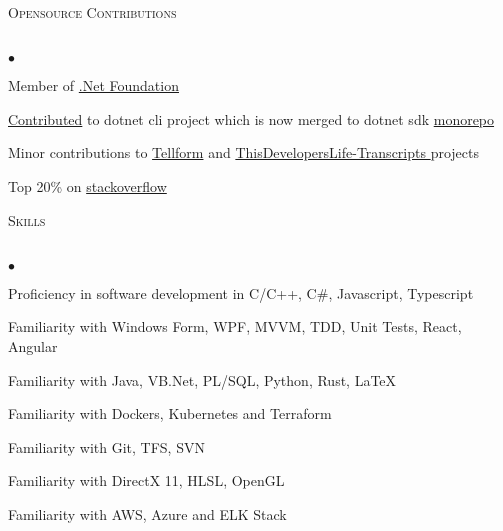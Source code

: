 \documentclass{article}
\newcommand{\lineunder}{\vspace*{-8pt} \\ \hspace*{-18pt} \hrulefill \\}
\newcommand{\header}[1]{{\hspace*{-15pt}\vspace*{6pt} \textsc{#1}} \vspace*{-6pt} \lineunder}
\newenvironment{achievements}{\begin{list}{$\bullet$}{\topsep 0pt \itemsep -2pt}}{\vspace*{4pt}\end{list}}
\begin{document}
\header{Opensource Contributions}
\begin{achievements}
\item
  Member of \href{https://dotnetfoundation.org/}{.Net Foundation}
\item
  \href{https://github.com/dotnet/cli/pull/10914}{Contributed} to dotnet cli project which is now merged to dotnet sdk \href{https://github.com/dotnet/sdk}{monorepo}
\item
  Minor contributions to \href{https://github.com/tellform/tellform}{Tellform} and \href{https://github.com/shanselman/ThisDevelopersLife-Transcripts/pull/36}{ThisDevelopersLife-Transcripts
} projects
\item
  Top 20\% on \href{https://stackoverflow.com/users/713683/luqi}{stackoverflow} 
\end{achievements}

\header{Skills}
\begin{achievements}
\item Proficiency in software development in C/C++, C\#, Javascript, Typescript
\item Familiarity with Windows Form, WPF, MVVM, TDD, Unit Tests, React, Angular
\item Familiarity with Java, VB.Net, PL/SQL, Python, Rust, \LaTeX
\item Familiarity with Dockers, Kubernetes and Terraform
\item Familiarity with Git, TFS, SVN 
\item Familiarity with DirectX 11, HLSL, OpenGL 
\item Familiarity with AWS, Azure and ELK Stack
\end{achievements}
\end{document}
